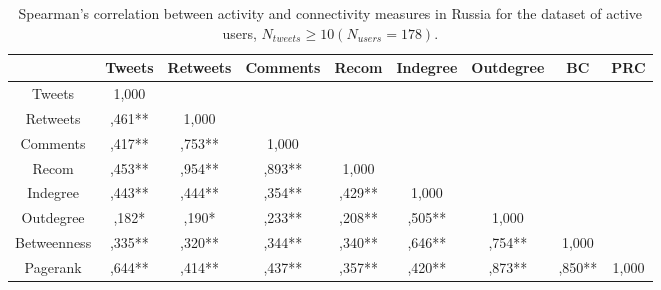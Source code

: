 \begin{table}[ht]%
	\centering
	\caption{Spearman’s correlation between activity and connectivity measures in Russia for the
		dataset of active users, \(N_{tweets} \geq 10 (N_{users} = 178)\).}%
	\label{tab:spearmanCorrelationRussiaActive}%
	\begin{adjustbox}{width=1\textwidth}
		\small
		\begin{tabular}{ c  c  c  c  c  c  c  c  c }%
			\toprule
			& Tweets & Retweets & Comments & Recom & Indegree & Outdegree & BC & PRC \\
			\hline
			Tweets & 1,000 &  &  &  &  &  &  & \\
			Retweets & ,461** & 1,000 &  &  &  &  &  & \\
			Comments & ,417** & ,753** & 1,000 &  &  &  &  & \\
			Recom & ,453** & ,954** & ,893**  & 1,000 &  &  &  & \\
			Indegree & ,443** & ,444** & ,354** & ,429** & 1,000 &  &  & \\
			Outdegree & ,182* & ,190* & ,233** & ,208** & ,505** & 1,000 &  & \\
			Betweenness & ,335** & ,320** & ,344** & ,340** & ,646** & ,754**  & 1,000 & \\
			Pagerank & ,644** & ,414** & ,437** & ,357** & ,420** & ,873** & ,850** & 1,000\\
			\bottomrule
		\end{tabular}%
	\end{adjustbox}
\end{table}

